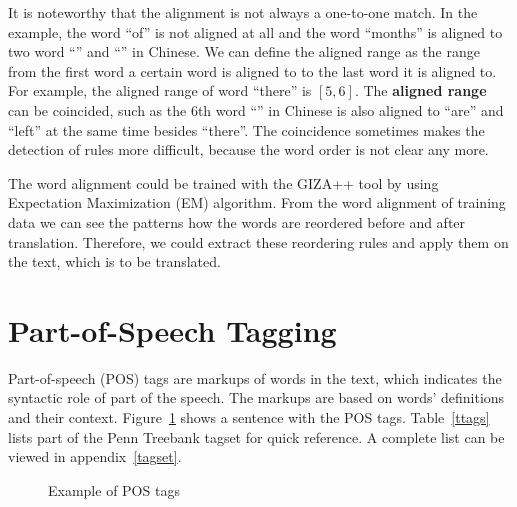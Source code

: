 \label{alignedrange}
It is noteworthy that the alignment is not always a one-to-one match. In the example, the word ``of'' is not aligned at all and the word ``months'' is aligned to two word ``'' and ``'' in Chinese. We can define the aligned range as the range from the first word a certain word is aligned to to the last word it is aligned to. For example, the aligned range of word ``there'' is $[5,6]$. The \textbf{aligned range} can be coincided, such as the $6$th word ``'' in Chinese is also aligned to ``are'' and ``left'' at the same time besides ``there''. The coincidence sometimes makes the detection of rules more difficult, because the word order is not clear any more.

The word alignment could be trained with the GIZA++ tool by using Expectation Maximization (EM) algorithm. From the word alignment of training data we can see the patterns how the words are reordered before and after translation. Therefore, we could extract these reordering rules and apply them on the text, which is to be translated.

\section{Part-of-Speech Tagging}

Part-of-speech (POS) tags are markups of words in the text, which indicates the syntactic role of part of the speech. The markups are based on words' definitions and their context. Figure~\ref{tags} shows a sentence with the POS tags. Table~\ref{ttags} lists part of the Penn Treebank tagset for quick reference. A complete list can be viewed in appendix~\ref{tagset}.

\begin{figure}[H]

\centering

\caption{Example of POS tags}
\label{tags}
\end{figure}

